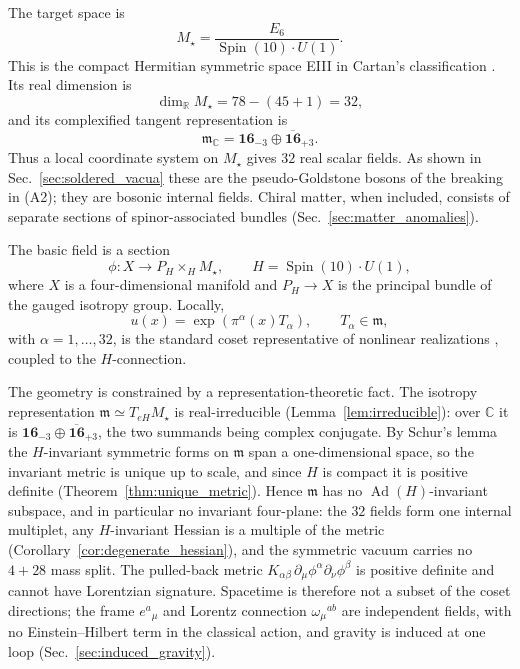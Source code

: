 \documentclass[aps,prd,preprint,longbibliography,nofootinbib,superscriptaddress,floatfix]{revtex4-2}
\newcommand{\Spin}{\operatorname{Spin}}
\newcommand{\Ad}{\operatorname{Ad}}
\begin{document}
The target space is
\begin{equation}
    M_\star
    =
    \frac{E_6}{\Spin(10)\cdot U(1)} .
    \label{eq:eiii_intro}
\end{equation}
This is the compact Hermitian symmetric space EIII in Cartan's classification
\cite{Helgason,Besse}. Its real dimension is
\begin{equation}
    \dim_{\mathbb R}M_\star
    =
    78-(45+1)
    =
    32,
    \label{eq:eiii_dimension_intro}
\end{equation}
and its complexified tangent representation is
\begin{equation}
    \mathfrak m_{\mathbb C}
    =
    \mathbf{16}_{-3}\oplus\overline{\mathbf{16}}_{+3}.
    \label{eq:eiii_tangent_intro}
\end{equation}
Thus a local coordinate system on \(M_\star\) gives \(32\) real scalar fields.
As shown in Sec.~\ref{sec:soldered_vacua} these are the pseudo-Goldstone bosons
of the breaking in (A2); they are bosonic internal fields. Chiral matter, when
included, consists of separate sections of spinor-associated bundles
(Sec.~\ref{sec:matter_anomalies}).

The basic field is a section
\begin{equation}
    \phi:X\longrightarrow P_H\times_H M_\star ,
    \qquad
    H=\Spin(10)\cdot U(1),
    \label{eq:coset_field_intro}
\end{equation}
where \(X\) is a four-dimensional manifold and \(P_H\to X\) is the principal
bundle of the gauged isotropy group. Locally,
\begin{equation}
    u(x)
    =
    \exp\!\left(\pi^\alpha(x)T_\alpha\right),
    \qquad
    T_\alpha\in\mathfrak m,
    \label{eq:local_coset_intro}
\end{equation}
with \(\alpha=1,\ldots,32\), is the standard coset representative of nonlinear
realizations \cite{ColemanWessZumino,CallanColemanWessZumino,WeinbergQFT2},
coupled to the \(H\)-connection.

The geometry is constrained by a representation-theoretic fact. The isotropy
representation \(\mathfrak m\simeq T_{eH}M_\star\) is real-irreducible
(Lemma~\ref{lem:irreducible}): over \(\mathbb C\) it is
\(\mathbf{16}_{-3}\oplus\overline{\mathbf{16}}_{+3}\), the two summands being
complex conjugate. By Schur's lemma the \(H\)-invariant symmetric forms on
\(\mathfrak m\) span a one-dimensional space, so the invariant metric is unique
up to scale, and since \(H\) is compact it is positive definite
(Theorem~\ref{thm:unique_metric}). Hence \(\mathfrak m\) has no
\(\Ad(H)\)-invariant subspace, and in particular no invariant four-plane: the
\(32\) fields form one internal multiplet, any \(H\)-invariant Hessian is a
multiple of the metric (Corollary~\ref{cor:degenerate_hessian}), and the
symmetric vacuum carries no \(4+28\) mass split. The pulled-back metric
\(K_{\alpha\beta}\,\partial_\mu\phi^\alpha\partial_\nu\phi^\beta\) is positive
definite and cannot have Lorentzian signature. Spacetime is therefore not a
subset of the coset directions; the frame \(e^a{}_\mu\) and Lorentz connection
\(\omega_\mu{}^{ab}\) are independent fields, with no Einstein--Hilbert term in
the classical action, and gravity is induced at one loop
(Sec.~\ref{sec:induced_gravity}).
\end{document}
